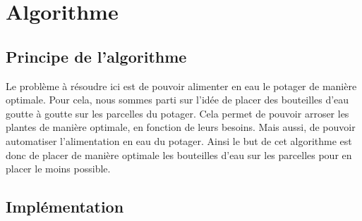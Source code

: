 \documentclass[french,a4paper]{article}
\begin{document}
\newpage
\section{Algorithme}
\subsection{Principe de l'algorithme}
Le problème à résoudre ici est de pouvoir alimenter en eau le potager de manière optimale. Pour cela, nous sommes parti sur l'idée de placer des bouteilles d'eau goutte à goutte sur les parcelles du potager.
Cela permet de pouvoir arroser les plantes de manière optimale, en fonction de leurs besoins. Mais aussi, de pouvoir automatiser l'alimentation en eau du potager.
Ainsi le but de cet algorithme est donc de placer de manière optimale les bouteilles d'eau sur les parcelles pour en placer le moins possible.
\subsection{Implémentation}
\end{document}

